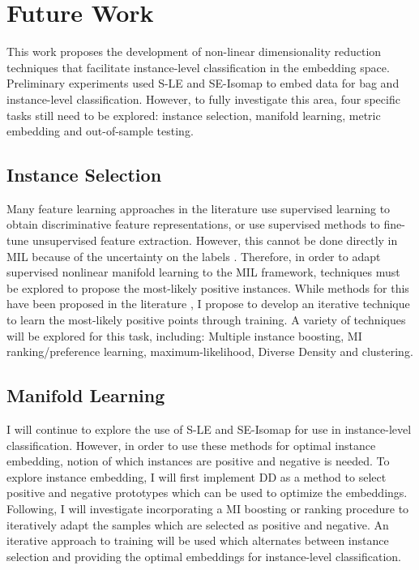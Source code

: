 \section{Future Work}
This work proposes the development of non-linear dimensionality reduction techniques that facilitate instance-level classification in the embedding space.  Preliminary experiments used S-LE and SE-Isomap to embed data for bag and instance-level classification.  However, to fully investigate this area, four specific tasks still need to be explored: instance selection, manifold learning, metric embedding and out-of-sample testing.

\subsection{Instance Selection}
Many feature learning approaches in the literature use supervised learning to obtain discriminative feature representations, or use supervised methods to fine-tune unsupervised  feature extraction.  However, this cannot be done directly in MIL because of the uncertainty on the labels \citep{Carbonneau2016MILSurvey}.  Therefore, in order to adapt supervised nonlinear manifold learning to the MIL framework, techniques must be explored to propose the most-likely positive instances.  While methods for this have been proposed in the literature \citep{Kim2010LocalDRMIL, Maron1998DiverseDensity, Bocinsky2019SPIEMIACEInitialization}, I propose to develop an iterative technique to learn the most-likely positive points through training.  A variety of techniques will be explored for this task, including: Multiple instance boosting, MI ranking/preference learning, maximum-likelihood, Diverse Density and clustering.  

\subsection{Manifold Learning}
I will continue to explore the use of S-LE and SE-Isomap for use in instance-level classification.  However, in order to use these methods for optimal instance embedding, notion of which instances are positive and negative is needed.  To explore instance  embedding, I will first implement DD as a method to select positive and negative prototypes which can be used to optimize the embeddings.  Following, I will investigate incorporating a MI boosting or ranking procedure to iteratively adapt the samples which are selected as positive and negative.  An iterative approach to training will be used which alternates between instance selection and providing the optimal embeddings for instance-level classification.

